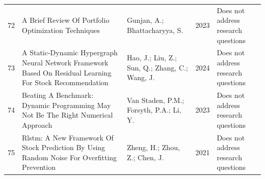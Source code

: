 \begin{small}
\begin{longtable}{r p{5cm} p{4cm} p{1cm} p{5cm}}
72 & A Brief Review Of Portfolio Optimization Techniques & Gunjan, A.; Bhattacharyya, S. & 2023 & Does not address research questions \\
73 & A Static-Dynamic Hypergraph Neural Network Framework Based On Residual Learning For Stock Recommendation & Hao, J.; Liu, Z.; Sun, Q.; Zhang, C.; Wang, J. & 2024 & Does not address research questions \\
74 & Beating A Benchmark: Dynamic Programming May Not Be The Right Numerical Approach & Van Staden, P.M.; Forsyth, P.A.; Li, Y. & 2023 & Does not address research questions \\
75 & Rlstm: A New Framework Of Stock Prediction By Using Random Noise For Overfitting Prevention & Zheng, H.; Zhou, Z.; Chen, J. & 2021 & Does not address research questions \\
\end{longtable}
\end{small}
